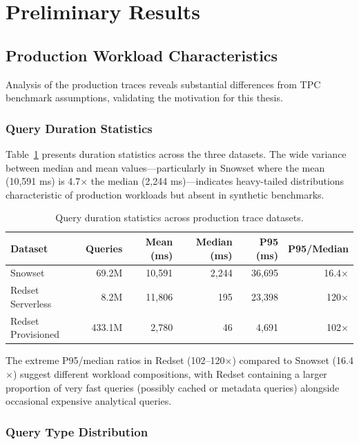 \documentclass[12pt]{report}
\begin{document}
\section{Preliminary Results}
\label{sec:results}

\subsection{Production Workload Characteristics}
\label{subsec:production-characteristics}

Analysis of the production traces reveals substantial differences from TPC benchmark assumptions, validating the motivation for this thesis.

\subsubsection{Query Duration Statistics}

Table~\ref{tab:duration-stats} presents duration statistics across the three datasets. The wide variance between median and mean values---particularly in Snowset where the mean (10,591 ms) is 4.7$\times$ the median (2,244 ms)---indicates heavy-tailed distributions characteristic of production workloads but absent in synthetic benchmarks.

\begin{table}[H]
    \centering
    \caption{Query duration statistics across production trace datasets.}
    \label{tab:duration-stats}
    \begin{tabular}{lrrrrr}
        \toprule
        Dataset & Queries & Mean (ms) & Median (ms) & P95 (ms) & P95/Median \\
        \midrule
        Snowset & 69.2M & 10,591 & 2,244 & 36,695 & 16.4$\times$ \\
        Redset Serverless & 8.2M & 11,806 & 195 & 23,398 & 120$\times$ \\
        Redset Provisioned & 433.1M & 2,780 & 46 & 4,691 & 102$\times$ \\
        \bottomrule
    \end{tabular}
\end{table}

The extreme P95/median ratios in Redset (102--120$\times$) compared to Snowset (16.4$\times$) suggest different workload compositions, with Redset containing a larger proportion of very fast queries (possibly cached or metadata queries) alongside occasional expensive analytical queries.

\subsubsection{Query Type Distribution}
\end{document}
